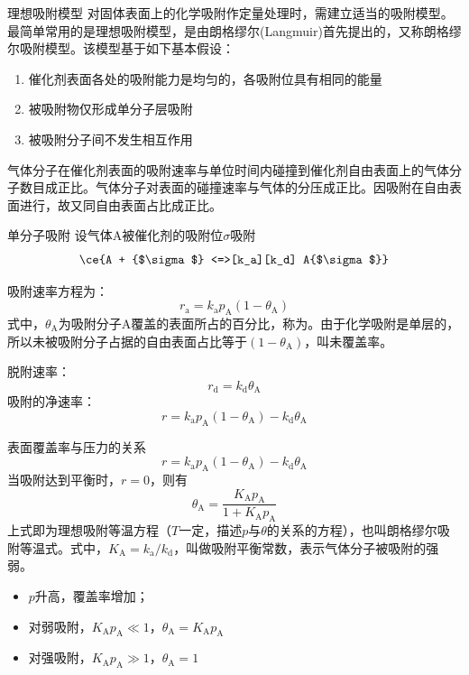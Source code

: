 \begin{frame}{理想吸附模型}
    对固体表面上的化学吸附作定量处理时，需建立适当的吸附模型。最简单常用的是理想吸附模型，是由朗格缪尔(Langmuir)首先提出的，又称朗格缪尔吸附模型。该模型基于如下基本假设：
    \begin{enumerate}
        \item 催化剂表面各处的吸附能力是均匀的，各吸附位具有相同的能量
        \item 被吸附物仅形成单分子层吸附
        \item 被吸附分子间不发生相互作用 
    \end{enumerate}
    气体分子在催化剂表面的吸附速率与单位时间内碰撞到催化剂自由表面上的气体分子数目成正比。气体分子对表面的碰撞速率与气体的分压成正比。因吸附在自由表面进行，故又同自由表面占比成正比。
\end{frame}


\begin{frame}{单分子吸附}
    设气体A被催化剂的吸附位$\sigma$吸附
    $$\ce{A + {$\sigma$} <=>[k_a][k_d] A{$\sigma$}}$$
    
    吸附速率方程为：
    \[
        r_\mathrm{a}=k_\mathrm{a}p_\mathrm{A}(1-\theta_\mathrm{A})
    \]
    式中，$\theta_\mathrm{A}$为吸附分子A覆盖的表面所占的百分比，称为。由于化学吸附是单层的，所以未被吸附分子占据的自由表面占比等于$(1-\theta_\mathrm{A})$，叫未覆盖率。
    
    脱附速率：
    \[
        r_\mathrm{d}=k_\mathrm{d}\theta_\mathrm{A}
    \]
    吸附的净速率：
    \[
        r=k_\mathrm{a}p_\mathrm{A}(1-\theta_\mathrm{A})-k_\mathrm{d}\theta_\mathrm{A}
    \]
   
\end{frame}


\begin{frame}{表面覆盖率与压力的关系}
        \[
            r=k_\mathrm{a}p_\mathrm{A}(1-\theta_\mathrm{A})-k_\mathrm{d}\theta_\mathrm{A}
        \]
        当吸附达到平衡时，$r=0$，则有
        \[
            \theta_\mathrm{A}=\frac{K_\mathrm{A}p_\mathrm{A}}{1+K_\mathrm{A}p_\mathrm{A}}
        \]
        上式即为理想吸附等温方程（$T$一定，描述$p$与$\theta$的关系的方程），也叫朗格缪尔吸附等温式。式中，$K_\mathrm{A}=k_\mathrm{a}/k_\mathrm{d}$，叫做吸附平衡常数，表示气体分子被吸附的强弱。
        \begin{itemize}
          \item $p$升高，覆盖率增加；
          \item 对弱吸附，$K_\mathrm{A}p_\mathrm{A}\ll1$，$\theta_\mathrm{A}=K_\mathrm{A}p_\mathrm{A}$
          \item 对强吸附，$K_\mathrm{A}p_\mathrm{A}\gg1$，$\theta_\mathrm{A}=1$
        \end{itemize}
\end{frame}


